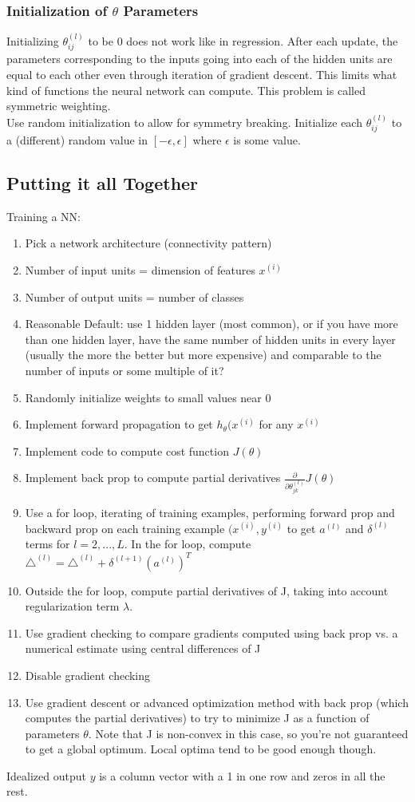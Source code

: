 \documentclass[11pt,letterpaper]{article}
\begin{document}
\subsubsection{Initialization of $\theta$ Parameters}
Initializing $\theta_{ij}^{(l)}$ to be 0 does not work like in regression. After each update, the parameters corresponding to the inputs going into each of the hidden units are equal to each other even through iteration of gradient descent. This limits what kind of functions the neural network can compute. This problem is called symmetric weighting.\\
Use random initialization to allow for symmetry breaking. Initialize each $\theta_{ij}^{(l)}$ to a (different) random value in $[-\epsilon, \epsilon]$ where $\epsilon$ is some value.

\subsection{Putting it all Together}
Training a NN:
\begin{enumerate}
	\item Pick a network architecture (connectivity pattern)
	\item Number of input units = dimension of features $x^{(i)}$
	\item Number of output units = number of classes
	\item Reasonable Default: use 1 hidden layer (most common), or if you have more than one hidden layer, have the same number of hidden units in every layer (usually the more the better but more expensive) and comparable to the number of inputs or some multiple of it?
	\item Randomly initialize weights to small values near 0
	\item Implement forward propagation to get $h_\theta(x^{(i)}$ for any $x^{(i)}$
	\item Implement code to compute cost function $J(\theta)$
	\item Implement back prop to compute partial derivatives $\frac{\partial}{\partial \theta_{jk}^{(l)}}J(\theta)$
	\item Use a for loop, iterating of training examples, performing forward prop and backward prop on each training example $(x^{(i)}, y^{(i)}$ to get $a^{(l)}$ and $\delta^{(l)}$ terms for $l=2,...,L$. In the for loop, compute $\triangle^{(l)} = \triangle^{(l)} + \delta^{(l+1)}(a^{(l)})^T$
	\item Outside the for loop, compute partial derivatives of J, taking into account regularization term $\lambda$.
	\item Use gradient checking to compare gradients computed using back prop vs. a numerical estimate using central differences of J
	\item Disable gradient checking
	\item Use gradient descent or advanced optimization method with back prop (which computes the partial derivatives) to try to minimize J as a function of parameters $\theta$. Note that J is non-convex in this case, so you're not guaranteed to get a global optimum. Local optima tend to be good enough though.
\end{enumerate}
Idealized output $y$ is a column vector with a 1 in one row and zeros in all the rest.
\end{document}
